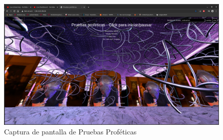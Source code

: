 \begin{figure}
  \includegraphics[width=\textwidth]{img/pruebas2.png}
  \caption{Captura de pantalla de Pruebas Proféticas}
\end{figure}
